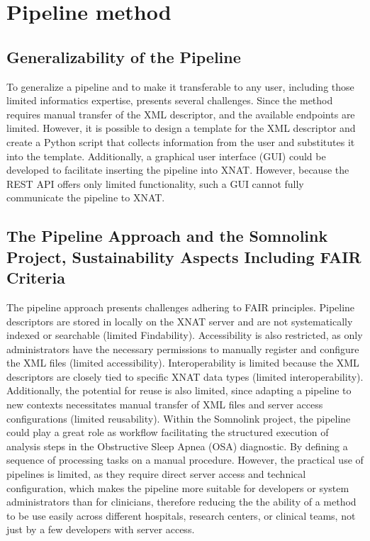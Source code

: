 \section{Pipeline method}
\subsection{Generalizability of the Pipeline}
\normalsize
To generalize a pipeline and to make it transferable to any user, including those limited informatics expertise, presents several challenges.
Since the method requires manual transfer of the XML descriptor,  and the available endpoints are limited. 
However, it is possible to design a template for the XML descriptor and create a Python script that collects information from the user and substitutes it into the template. Additionally, a graphical user interface (GUI) could be developed to facilitate inserting the pipeline into XNAT. However, because the REST API offers only limited functionality, such a GUI cannot fully communicate the pipeline to XNAT.






\subsection{The Pipeline Approach and the Somnolink Project, Sustainability Aspects Including FAIR Criteria}
The pipeline approach presents challenges adhering to FAIR principles.
Pipeline descriptors are stored in locally on the XNAT server and are not systematically indexed or searchable (limited Findability).
 Accessibility is also restricted, as only administrators have the necessary permissions to manually register and configure the XML files (limited accessibility).
 Interoperability is limited because the XML descriptors are closely tied to specific XNAT data types (limited interoperability). Additionally, the potential for reuse is also limited, since adapting a pipeline to new contexts necessitates manual transfer of XML files and server access configurations (limited reusability). Within the Somnolink project, the pipeline could play a great role as workflow  facilitating the structured execution of analysis steps in the Obstructive Sleep Apnea (OSA) diagnostic. By defining a sequence of processing tasks on a manual procedure. However, the practical use of pipelines is limited, as they require direct server access and technical configuration, which makes the pipeline more suitable for developers or system administrators than for clinicians, therefore reducing the the ability of a method to be use easily across different hospitals, research centers, or clinical teams, not just by a few developers with server access.


